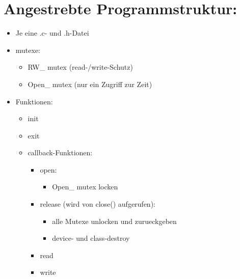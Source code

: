 \documentclass[paper=a4, fontsize=12pt]{article}
\begin{document}
\section{Angestrebte Programmstruktur:}
\begin{itemize}
\item Je eine .c- und .h-Datei
\item mutexe:
\begin{itemize}
\item RW\_ mutex (read-/write-Schutz)
\item Open\_ mutex (nur ein Zugriff zur Zeit)
\end{itemize}
\item Funktionen:
\begin{itemize}
\item init
\item exit
\item callback-Funktionen:
\begin{itemize}
\item open:
\begin{itemize}
\item Open\_ mutex locken
\end{itemize}
\item release (wird von close() aufgerufen):
\begin{itemize}
\item alle Mutexe unlocken und zurueckgeben
\item device- und class-destroy
\end{itemize}
\item read
\item write
\end{itemize}
\end{itemize}
\end{itemize}
\end{document}
